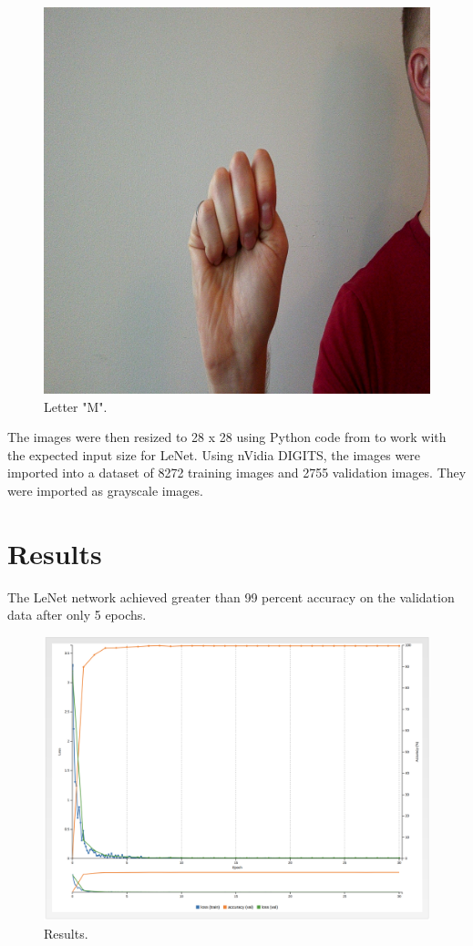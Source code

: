 \documentclass[10pt,journal,compsoc]{IEEEtran}
\begin{document}
\begin{figure}[thpb]
      \centering
      \includegraphics[width=\linewidth]{test_4127}
      \caption{Letter "M".}
      \label{fig:letter_m}
\end{figure}

The images were then resized to 28 x 28 using Python code from \cite{Budy} to work with the expected input size for LeNet. Using nVidia DIGITS, the images were imported into a dataset of 8272 training images and 2755 validation images. They were imported as grayscale images.

\section{Results}

The LeNet network achieved greater than 99 percent accuracy on the validation data after only 5 epochs.

\begin{figure}[thpb]
      \centering
      \includegraphics[width=\linewidth]{lenet_results}
      \caption{Results.}
      \label{fig:results}
\end{figure}
\end{document}
